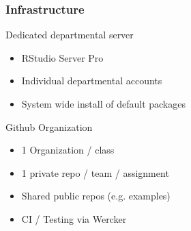 \documentclass[12pt]{beamer}
\begin{document}

\begin{frame}
\frametitle{Infrastructure}

Dedicated departmental server
\begin{itemize}
\item RStudio Server Pro
\item Individual departmental accounts
\item System wide install of default packages
\end{itemize}

\vspace{3mm}

Github Organization
\begin{itemize}
\item 1 Organization / class
\item 1 private repo / team / assignment
\item Shared public repos (e.g. examples)
\item CI / Testing via Wercker
\end{itemize}

\end{frame}


\end{document}
